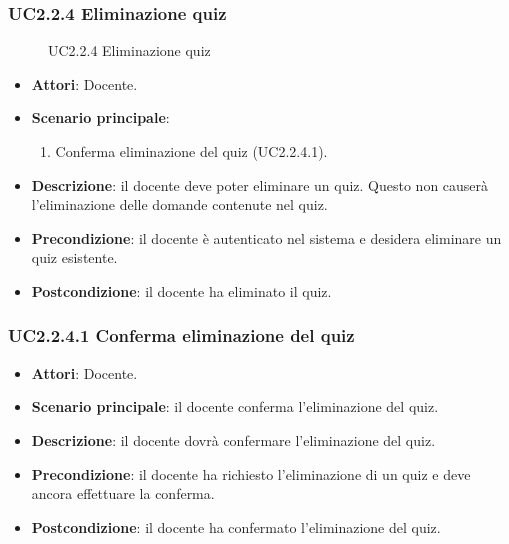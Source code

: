 \subsubsection{UC2.2.4 Eliminazione quiz}
\begin{figure}[H]
\centering
\noindent{}
\caption{UC2.2.4 Eliminazione quiz}
\end{figure}
\begin{itemize}
\item \textbf{Attori}: Docente.
\item \textbf{Scenario principale}:
\begin{enumerate}
\item Conferma eliminazione del quiz (UC2.2.4.1).
\end{enumerate}
\item \textbf{Descrizione}: il docente deve poter eliminare un quiz. Questo non causerà l’eliminazione delle domande contenute nel quiz.
\item \textbf{Precondizione}: il docente è autenticato nel sistema e desidera eliminare un quiz esistente.
\item \textbf{Postcondizione}: il docente ha eliminato il quiz.
\end{itemize}
\subsubsection{UC2.2.4.1 Conferma eliminazione del quiz}
\begin{itemize}
\item \textbf{Attori}: Docente.
\item \textbf{Scenario principale}: il docente conferma l'eliminazione del quiz.
\item \textbf{Descrizione}: il docente dovrà confermare l'eliminazione del quiz.
\item \textbf{Precondizione}: il docente ha richiesto l'eliminazione di un quiz e deve ancora effettuare la conferma.
\item \textbf{Postcondizione}: il docente ha confermato l'eliminazione del quiz.
\end{itemize}
